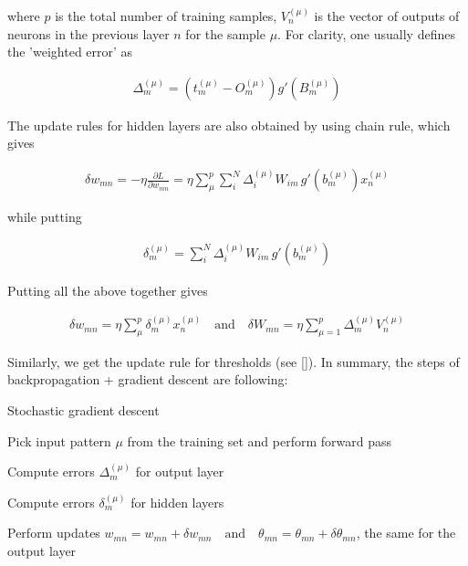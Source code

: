 \noindent where $ p $ is the total number of training samples, $ V_{n}^{(\mu)} $ is the vector of outputs of neurons in the previous layer $ n $ for the sample $ \mu $. For clarity, one usually defines the 'weighted error' as

\begin{gather}
	\Delta_{m}^{(\mu)} = (t_{m}^{(\mu)} - O_{m}^{(\mu)})   g'(B_{m}^{(\mu)})
\end{gather}

\noindent The update rules for hidden layers are also obtained by using chain rule, which gives

\begin{gather}
\delta w_{mn} = - \eta \frac{\partial L}{\partial w_{mn}} = \eta \sum\limits_{\mu}^{p} \sum\limits_{i}^{N}
\Delta_{i}^{(\mu)} W_{im} \, g'(b_{m}^{(\mu)}) x_{n}^{(\mu)}
\end{gather}

\noindent while putting

\begin{gather}
\delta_{m}^{(\mu)} = \sum\limits_{i}^{N} \Delta_{i}^{(\mu)} W_{im} \, g'(b_{m}^{(\mu)})
\end{gather}


\noindent Putting all the above together gives

\begin{gather}
\delta w_{mn} = \eta \sum\limits_{\mu}^{p} \delta_{m}^{(\mu)} x_{n}^{(\mu)}
\quad \text{and} \quad 
\delta W_{mn} = \eta \sum\limits_{\mu=1}^{p} \Delta_{m}^{(\mu)} V_{n}^{(\mu)}	
\end{gather}

\noindent Similarly, we get the update rule for thresholds (see []). In summary, the steps of backpropagation + gradient descent are following:
\begin{algorithm}
	\caption{Stochastic gradient descent}
	\begin{algorithmic}[1]
		\item Pick input pattern $ \mu $ from the training set and perform forward pass
		\item Compute errors $ \Delta_{m}^{(\mu)} $ for output layer
		\item Compute errors $ \delta_{m}^{(\mu)} $ for hidden layers
		\item Perform updates $w_{mn} = w_{mn} + \delta w_{mn} \quad \text{and} \quad \theta_{mn} = \theta_{mn} + \delta \theta_{mn}$, the same for the output layer
	\end{algorithmic}
\end{algorithm}

